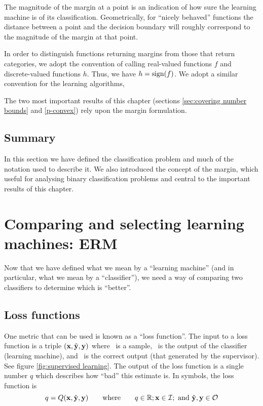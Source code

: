 The magnitude of the margin at a point is an indication of how sure the
learning machine is of its classification.  Geometrically, for
``nicely behaved'' functions the distance between a point and the
decision boundary will roughly correspond to the magnitude of the
margin at that point.

In order to distinguish functions returning margins from those that
return categories, we adopt the convention of calling real-valued
functions $f$ and discrete-valued functions $h$.  Thus, we have $h =
\mathrm{sign}(f)$.  We adopt a similar convention for the learning algorithms, 

The two most important results of this chapter (sections
\ref{sec:covering number bounds} and \ref{p-convex}) rely upon the
margin formulation.



\subsection{Summary}

In this section we have defined the classification problem and much of
the notation used to describe it.  We also introduced the concept of
the margin, which useful for analysing binary classification
problems and central to the important results of this chapter.



\section{Comparing and selecting learning machines: ERM}
\label{sec:erm}

Now that we have defined what we mean by a ``learning machine'' (and
in particular, what we mean by a ``classifier''), we need a way of
comparing two classifiers to determine which is ``better''.


\subsection{Loss functions}

One metric that can be used is known as a ``loss function''.  The
input to a loss function is a triple $(\mathbf{x}, \hat{\mathbf{y}}, \mathbf{y})$ where \bfx\
is a sample, \bfyh\ is the output of the classifier (learning
machine), and \bfy\ is the correct output (that generated by the
supervisor).  See figure \ref{fig:supervised learning}.  The output of
the loss function is a single number $q$ which describes how ``bad''
this estimate is.  In symbols, the loss function is
%
\begin{equation}
q = Q(\mathbf{x}, \hat{\mathbf{y}}, \mathbf{y}) \qquad \mbox{where} \qquad q \in \mathbb{R};
\mathbf{x} \in \mathcal{I}; \mbox{ and }\hat{\mathbf{y}}, \mathbf{y} \in \mathcal{O}
\end{equation}


